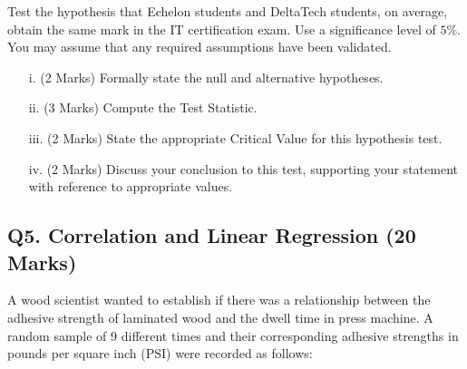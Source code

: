 \documentclass[a4paper,12pt]{article}
\begin{document}

Test the hypothesis that Echelon students and DeltaTech students, on average, obtain the same mark in the IT certification exam. Use a significance level of $5\%$. You may assume that any required assumptions have been validated.
\bigskip

\begin{itemize}
\item[i.](2 Marks) Formally state the null and alternative hypotheses.
\item[ii.](3 Marks) Compute the Test Statistic.
\item[iii.](2 Marks) State the appropriate Critical Value for this hypothesis test.
\item[iv.](2 Marks) Discuss your conclusion to this test, supporting your statement with reference to appropriate values.
\end{itemize}

%

\newpage
\subsection*{Q5. Correlation and Linear Regression (20 Marks)} %

A wood scientist wanted to establish if there was a relationship between the adhesive strength of laminated wood and the dwell time in press machine. A random sample of 9 different times and their corresponding adhesive strengths in pounds per square inch (PSI) were recorded as follows:
\end{document}
